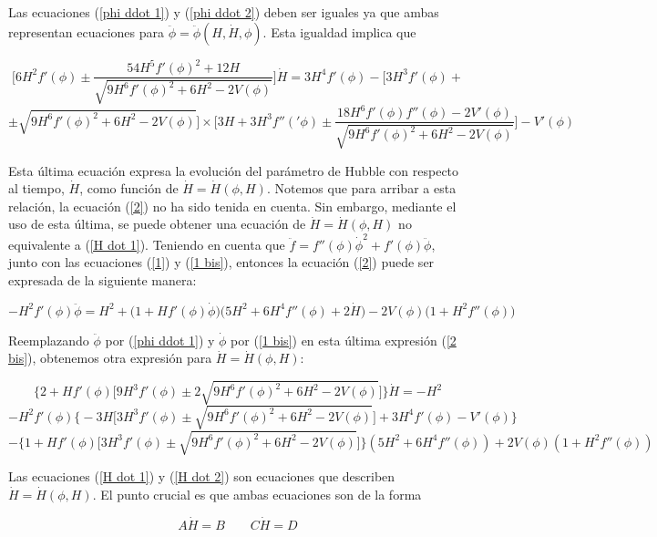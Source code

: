 Las ecuaciones (\ref{phi ddot 1}) y (\ref{phi ddot 2}) deben ser iguales ya que ambas representan ecuaciones para $\ddot{\phi}=\ddot{\phi}(H,\dot{H},\phi)$. Esta igualdad implica que 

$$
\bigg[6H^2f'(\phi)\pm \frac{54H^5 f'(\phi)^2+12H}{\sqrt{9H^6f'(\phi)^2+6H^2-2V(\phi)}}\bigg]\dot{H}=3H^4f'(\phi)-\bigg[3H^3f'(\phi)+
$$
\begin{equation}\label{H dot 1}
\pm \sqrt{9H^6f'(\phi)^2+6H^2-2V(\phi)}\bigg]\times\bigg[3H+3H^3f''('\phi)\pm\frac{18H^6 f'(\phi)f''(\phi)-2V'(\phi)}{\sqrt{9H^6f'(\phi)^2+6H^2-2V(\phi)}}\bigg]-V'(\phi)
\end{equation}


Esta última ecuación expresa la evolución del parámetro de Hubble con respecto al tiempo, $\dot{H}$, como función de $\dot{H}=\dot{H}(\phi,H)$. Notemos que para arribar a esta relación, la ecuación (\ref{2}) no ha sido tenida en cuenta. Sin embargo, mediante el uso de esta última, se puede obtener una ecuación de $\dot{H}=\dot{H}(\phi,H)$ no equivalente a (\ref{H dot 1}). Teniendo en cuenta que $\ddot{f}=f''(\phi)\dot{\phi}^2+f'(\phi)\ddot{\phi}$, junto con las ecuaciones (\ref{1}) y (\ref{1 bis}), entonces la ecuación (\ref{2}) puede ser expresada de la siguiente manera:

\begin{equation}\label{2 bis}
-H^2f'(\phi)\ddot{\phi}=H^2+\bigg(1+Hf'(\phi)\dot{\phi}\bigg)\bigg(5H^2+6H^4f''(\phi)+2\dot{H}\bigg)-2V(\phi)\bigg(1+H^2f''(\phi)\bigg)
\end{equation}


Reemplazando $\ddot{\phi}$ por (\ref{phi ddot 1}) y $\dot{\phi}$ por (\ref{1 bis}) en esta última expresión (\ref{2 bis}), obtenemos otra expresión para  $\dot{H}=\dot{H}(\phi,H)$:

$$
\bigg\{2+Hf'(\phi)\bigg[9H^3f'(\phi) \pm 2\sqrt{9H^6f'(\phi)^2+6H^2-2V(\phi)}\bigg]\bigg\}\dot{H}=-H^2
$$
$$
-H^2f'(\phi)\bigg\{-3H\bigg[3H^3f'(\phi) \pm \sqrt{9H^6f'(\phi)^2+6H^2-2V(\phi)}\bigg]+3H^4f'(\phi)-V'(\phi)\bigg\}
$$
\begin{equation}\label{H dot 2}
-\bigg\{1+Hf'(\phi)\bigg[3H^3f'(\phi) \pm \sqrt{9H^6f'(\phi)^2+6H^2-2V(\phi)}\bigg]\bigg\}(5H^2+6H^4 f''(\phi))+2V(\phi)(1+H^2f''(\phi))
\end{equation}

Las ecuaciones (\ref{H dot 1}) y (\ref{H dot 2}) son ecuaciones que describen $\dot{H}=\dot{H}(\phi,H)$. El punto crucial es que ambas ecuaciones son de la forma

$$
A\dot{H}=B \qquad C\dot{H}=D
$$


